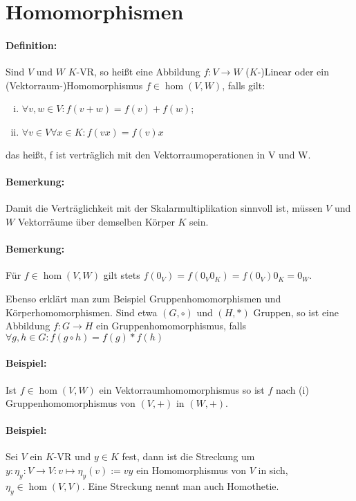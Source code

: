 \section{Homomorphismen}
\paragraph{Definition:}
	Sind $ V $ und $ W $ $ K $-VR, so heißt eine Abbildung $f: V \rightarrow W$ ($ K $-)Linear oder ein (Vektorraum-)Homomorphismus $f\in \hom(V,W)$, falls gilt:

\begin{enumerate}[(i)]
	\item $\forall v,w \in V: f(v+w) = f(v) + f(w)$;
	\item $\forall v\in V \forall x\in K: f(vx) = f(v)x$
\end{enumerate}

    das heißt, f ist verträglich mit den Vektorraumoperationen in V und W.
    
\paragraph{Bemerkung:}
	Damit die Verträglichkeit mit der Skalarmultiplikation sinnvoll ist, müssen $ V $ und $ W $ Vektorräume über demselben Körper $ K $ sein.
\paragraph{Bemerkung:}
	Für $f\in \hom(V,W)$ gilt stets $f(0_V) = f(0_V0_K) = f(0_V)0_K = 0_W$.
  
  Ebenso erklärt man zum Beispiel Gruppenhomomorphismen und Körperhomomorphismen. Sind etwa $(G,\circ)$ und $(H,*)$ Gruppen, so ist eine Abbildung $f: G \to H$ ein Gruppenhomomorphismus, falls $\forall g,h \in G: f(g\circ h) = f(g) * f(h)$
  
\paragraph{Beispiel:}
	Ist $f\in \hom(V,W)$ ein Vektorraumhomomorphismus so ist $ f $ nach (i) Gruppenhomomorphismus von $ (V,+) $ in $ (W,+) $.
  
\paragraph{Beispiel:}
	Sei $ V $ ein $ K $-VR und $y\in K$ fest, dann ist die Streckung um $y: \eta_y:V\to V: v\mapsto \eta_y(v) := vy$ ein Homomorphismus von $ V $ in sich, $\eta_y\in \hom(V,V)$. Eine Streckung nennt man auch Homothetie.
  	
